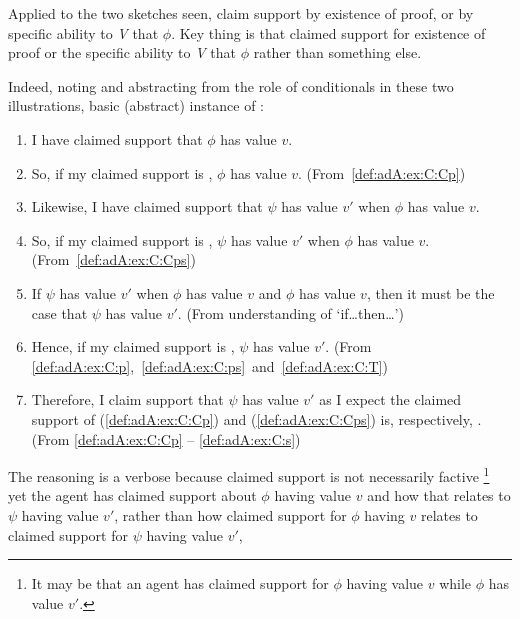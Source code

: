 \begin{note}
  Applied to the two sketches seen, claim support by existence of proof, or by specific ability to \emph{V} that \(\phi\).
  Key thing is that claimed support for existence of proof or the specific ability to \emph{V} that \(\phi\) rather than something else.

  Indeed, noting and abstracting from the role of conditionals in these two illustrations, basic (abstract) instance of \adA{}:

  {
    \small
    \begin{enumerate}[label=\arabic*., ref=\arabic*]
    \item\label{def:adA:ex:C:Cp} I have claimed support that \(\phi\) has value \(v\).
    \item\label{def:adA:ex:C:p} So, if my claimed support is \nmom{}, \(\phi\) has value \(v\). \hfill(From~\ref{def:adA:ex:C:Cp})
    \item\label{def:adA:ex:C:Cps} Likewise, I have claimed support that \(\psi\) has value \(v'\) when \(\phi\) has value \(v\).
    \item\label{def:adA:ex:C:ps} So, if my claimed support is \nmom{}, \(\psi\) has value \(v'\) when \(\phi\) has value \(v\). \hfill(From~\ref{def:adA:ex:C:Cps})
    \item\label{def:adA:ex:C:T} If \(\psi\) has value \(v'\) when \(\phi\) has value \(v\) and \(\phi\) has value \(v\), then it must be the case that \(\psi\) has value \(v'\). \hfill (From understanding of `if\dots then\dots')
    \item\label{def:adA:ex:C:s} Hence, if my claimed support is \nmom{}, \(\psi\) has value \(v'\).\newline
      \mbox{}\hfill (From \ref{def:adA:ex:C:p},~\ref{def:adA:ex:C:ps}~and~\ref{def:adA:ex:C:T})
    \item Therefore, I claim support that \(\psi\) has value \(v'\) as I expect the claimed support of (\ref{def:adA:ex:C:Cp}) and (\ref{def:adA:ex:C:Cps}) is, respectively, \nmom{}. \hfill (From \ref{def:adA:ex:C:Cp} -- \ref{def:adA:ex:C:s})
    \end{enumerate}
  }
  The reasoning is a verbose because claimed support is not necessarily factive
  \nolinebreak
  \footnote{
    It may be that an agent has claimed support for \(\phi\) having value \(v\) while \(\phi\) has value \(v'\).
  }
  yet the agent has claimed support about \(\phi\) having value \(v\) and how that relates to \(\psi\) having value \(v'\), rather than how claimed support for \(\phi\) having \(v\) relates to claimed support for \(\psi\) having value \(v'\),

\end{note}
